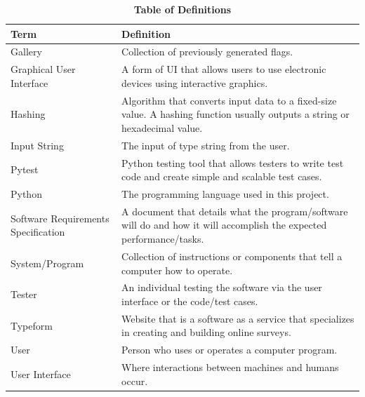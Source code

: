 \documentclass[12pt, titlepage]{article}
\newcommand{\newterm}[1]{\label{Term:#1} \MakeUppercase #1}
\begin{document}
\newpage
\begin{table}[htbp]
\caption{\textbf{Table of Definitions}} \label{def}

\begin{tabularx}{\textwidth}{p{3cm}X}
\toprule
\textbf{Term} & \textbf{Definition}\\
\midrule
\newterm{Gallery} & Collection of previously generated flags.\\
\hline
\newterm{Graphical User Interface} & A form of UI that allows users to use
  electronic devices using interactive graphics.\\
\hline
\newterm{Hashing} & Algorithm that converts input data to a fixed-size value.
  A hashing function usually outputs a string or hexadecimal value.\\
\hline
\newterm{Input String} & The input of type string from the user.\\
\hline
\newterm{Pytest} & Python testing tool that allows testers to write test code
  and create simple and scalable test cases.\\
\hline
\newterm{Python} & The programming language used in this project.\\
\hline
\newterm{Software Requirements Specification} & A document that details what
  the program/software will do and how it will accomplish the expected
  performance/tasks.\\
\hline
\newterm{System/Program} & Collection of instructions or components that tell
  a computer how to operate.\\
\hline
\newterm{Tester} & An individual testing the software via the user interface
  or the code/test cases.\\
\hline
\newterm{Typeform} & Website that is a software as a service that specializes
  in creating and building online surveys.\\
\hline
\newterm{User} & Person who uses or operates a computer program.\\
\hline
\newterm{User Interface} & Where interactions between machines and humans
  occur.\\
\bottomrule
\end{tabularx}
    
\end{table} 

\newpage
\end{document}
